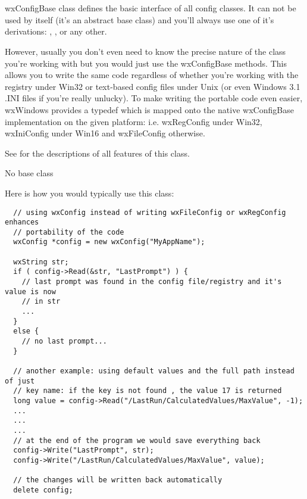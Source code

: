 \section{}\label{wxconfigbase}

wxConfigBase class defines the basic interface of all config classes. It can
not be used by itself (it's an abstract base class) and you'll always use one
of it's derivations: , 
,  or
any other.

However, usually you don't even need to know the precise nature of the class
you're working with but you would just use the wxConfigBase methods. This
allows you to write the same code regardless of whether you're working with
the registry under Win32 or text-based config files under Unix (or even
Windows 3.1 .INI files if you're really unlucky). To make writing the portable
code even easier, wxWindows provides a typedef  
which is mapped onto the native wxConfigBase implementation on the given
platform: i.e. wxRegConfig under Win32, wxIniConfig under Win16 and
wxFileConfig otherwise.

See  for the descriptions of all
features of this class.


No base class


Here is how you would typically use this class:

\begin{verbatim}
  // using wxConfig instead of writing wxFileConfig or wxRegConfig enhances
  // portability of the code
  wxConfig *config = new wxConfig("MyAppName");

  wxString str;
  if ( config->Read(&str, "LastPrompt") ) {
    // last prompt was found in the config file/registry and it's value is now
    // in str
    ...
  }
  else {
    // no last prompt...
  }

  // another example: using default values and the full path instead of just
  // key name: if the key is not found , the value 17 is returned
  long value = config->Read("/LastRun/CalculatedValues/MaxValue", -1);
  ...
  ...
  ...
  // at the end of the program we would save everything back
  config->Write("LastPrompt", str);
  config->Write("/LastRun/CalculatedValues/MaxValue", value);

  // the changes will be written back automatically
  delete config;
\end{verbatim}

